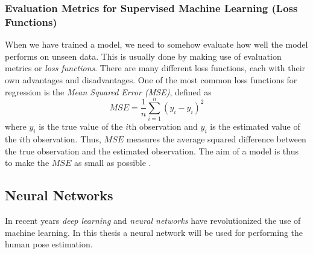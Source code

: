 \documentclass[main.tex]{subfiles}
\begin{document}
\subsubsection{Evaluation Metrics for Supervised Machine Learning (Loss Functions)}
When we have trained a model, we need to somehow evaluate how well the model performs on unseen data. This is usually done by making use of evaluation metrics or \textit{loss functions}. There are many different loss functions, each with their own advantages and disadvantages. One of the most common loss functions for regression is the \textit{Mean Squared Error (MSE)}, defined as
$$MSE = \frac{1}{n} \sum_{i = 1} ^n \left( y_i - \hat{y}_i \right)^2$$
where $y_i$ is the true value of the $i$th observation and $\hat{y}_i$ is the estimated value of the $i$th observation. Thus, $MSE$ measures the average squared difference between the true observation and the estimated observation. The aim of a model is thus to make the $MSE$ as small as possible \cite{ISL}.

\subsection{Neural Networks}
In recent years \textit{deep learning} and \textit{neural networks} have revolutionized the use of machine learning. In this thesis a neural network will be used for performing the human pose estimation.
\end{document}
